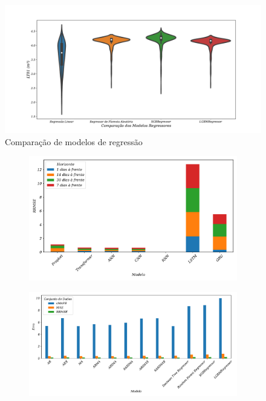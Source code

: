 \begin{figure}[!h]
	\centering
	\caption{Comparação de modelos de regressão}\label{fig:violin-lr-xgb-lgbm-rf}
	\includegraphics[width=0.8\linewidth]{Resultados/Figuras/violin-LR-XGB-LGBM-RF}
	
\end{figure}

\begin{figure}[H]
	\centering
	\caption{Análise comparativa dos modelos utilizando gráfico de barras \label{fig:rrmse_comparar} \label{fig:basic_comparar}}
	\begin{subfigure}{0.8\textwidth}
		\includegraphics[width=\linewidth]{Resultados/Figuras/rrmse_comparar}
	
		
	\end{subfigure}
	
	\begin{subfigure}{0.8\textwidth}
		\includegraphics[width=\linewidth]{Resultados/Figuras/basic_comparar}
		
		
	\end{subfigure}
	

\end{figure}


